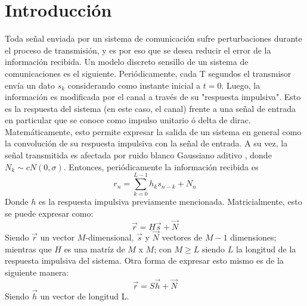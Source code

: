 
%
\section{Introducci\'on}
Toda se\~nal enviada por un sistema de comunicaci\'on sufre perturbaciones durante el proceso de transmisi\'on, y es por eso que se desea reducir el error de la informaci\'on recibida.
Un modelo discreto sensillo de un sistema de comunicaciones es el siguiente. Peri\'odicamente, cada T segundos el transmisor env\'ia un dato $s_k$ considerando como instante inicial a $t = 0$. Luego, la informaci\'on es modificada por el canal a trav\'es de su "respuesta impulsiva". Esto es la respuesta del sistema (en este caso, el canal) frente a una se\~nal de entrada en particular que se conoce como impulso unitario \'o delta de dirac. Matem\'aticamente, esto permite expresar la salida de un sistema en general como la convoluci\'on de su respuesta impulsiva con la se\~nal de entrada.
A su vez, la se\~nal transmitida es afectada por ruido blanco Gaussiano aditivo , donde $N_k \sim cN(0,\sigma)$. Entonces, peri\'odicamente la informaci\'on recibida es \begin{equation*} r_n = \sum_{k=0}^{L-1} h_k s_{n-k} + N_n\end{equation*} Donde $h$  es la respuesta impulsiva previamente mencionada. Matricialmente, esto se puede expresar como: \begin{equation*} \vec{r} = H \vec{s} + \vec{N} \end{equation*} Siendo $ \vec{r}$ un vector $M$-dimensional,  $ \vec{s}$ y $ \vec{N}$  vectores de $M-1$ dimensiones; mientras que $H$ es una matr\'iz de $M$ x $M$; con $M\geq L$ siendo $L$ la longitud de la respuesta impulsiva del sistema. Otra forma de expresar esto mismo es de la siguiente manera:   \begin{equation*} \vec{r} = S \vec{h} + \vec{N} \end{equation*} Siendo $\vec{h}$ un vector de longitud L.
